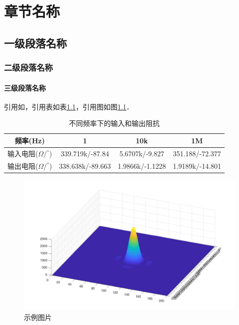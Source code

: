 \chapter{章节名称}
\section{一级段落名称}
\subsection{二级段落名称}
\subsubsection{三级段落名称}
引用如，引用表如表\ref{tab:input_output_r}，引用图如图\ref{fig:sample}．

\begin{table}[h]
\small %
\centering
\caption{不同频率下的输入和输出阻抗}
\label{tab:input_output_r}
\begin{tabular}{cccc} %
\toprule %
频率(Hz) & 1 & 10k & 1M \\
\midrule
输入电阻($\Omega/^\circ$) & 339.719k/-87.84 & 5.6707k/-9.827 & 351.188/-72.377\\
输出电阻($\Omega/^\circ$) & 338.638k/-89.663 & 1.9866k/-1.1228 & 1.9189k/-14.801 \\
\bottomrule
\end{tabular}
\end{table}

\begin{figure}[h]
\centering
\includegraphics[width=12cm]{Images/Sample.jpg}
\caption{示例图片}
\label{fig:sample}
\end{figure}
\clearpage